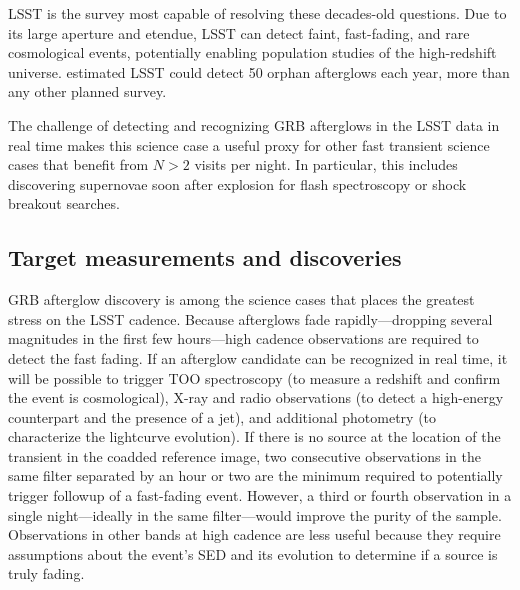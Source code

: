 LSST is the survey most capable of resolving these decades-old questions.  Due to its large aperture and etendue, LSST can detect faint, fast-fading, and rare cosmological events, potentially enabling population studies of the high-redshift universe.  
\citet{2015A&A...578A..71G} estimated LSST could detect 50 orphan afterglows each year, more than any other planned survey.




The challenge of detecting and recognizing GRB afterglows in the LSST data in 
real time makes this science case a useful proxy for other fast transient 
science cases that benefit from $N > 2$ visits per night.  In particular, this 
includes discovering supernovae soon after explosion for flash spectroscopy or 
shock breakout searches.



\subsection{Target measurements and discoveries}
\label{sec:keyword:targets}

GRB afterglow discovery is among the science cases that places the greatest stress on the LSST cadence.  Because afterglows fade rapidly---dropping several magnitudes in the first few hours---high cadence observations are required to detect the fast fading.  
If an afterglow candidate can be recognized in real time, it will be possible to trigger TOO spectroscopy (to measure a redshift and confirm the event is cosmological), X-ray and radio observations (to detect a high-energy counterpart and the presence of a jet), and additional photometry (to characterize the lightcurve evolution).  If there is no source at the location of the transient in the coadded reference image, two consecutive observations in the same filter separated by an hour or two are the minimum required to potentially trigger followup of a fast-fading event.  
However, a third or fourth observation in a single night---ideally in the same filter---would improve the purity of the sample.  Observations in other bands at high cadence are less useful because they require assumptions about the event's SED and its evolution to determine if a source is truly fading.

